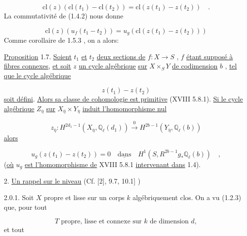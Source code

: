 
\begin{equation}\tag{1.6.8}
\mathrm{cl}(z) (\mathrm{cl}(t_1) - \mathrm{cl}(t_2)) = \mathrm{cl}(z(t_1) - z(t_2)) \quad .
\end{equation}
La commutativité de (1.4.2) nous donne

\begin{equation}\tag{1.6.9}
\mathrm{cl}(z) (u_f(t_1-t_2)) = u_g(\mathrm{cl}(z(t_1) - z(t_2)))
\end{equation}
Comme corollaire de 1.5.3 , on a alors:

\underline{Proposition} 1.7. \underline{Soient} $t_1$ \underline{et} $t_2$ \underline{deux sections de} $f : X \longrightarrow S$ , $f$ \underline{étant supposé à fibres connexes}, \underline{et soit} $z$ \underline{un cycle algébrique} \underline{sur} $X \times_S Y$ \underline{de codimension} $b$ , \underline{tel que le cycle algébrique}

\begin{equation}\tag{1.7.1}
z(t_1) - z(t_2)
\end{equation}
\underline{soit défini}. \underline{Alors sa classe de cohomologie est primitive} (XVIII 5.8.1). \underline{Si le cycle algébrique} $Z_{\overline{\eta}}$ \underline{sur} $X_{\overline{\eta}} \times Y_{\overline{\eta}}$ \underline{induit l'homomorphisme nul}

\begin{equation}\tag{1.7.2}
z_{\overline{\eta}} : H^{2d_1-1} (X_{\overline{\eta}}, \mathbb{Q}_\ell(d_1)) \stackrel{0}{\longrightarrow} H^{2b-1}(Y_{\overline{\eta}}, \mathbb{Q}_\ell(b))
\end{equation}
\underline{alors}

\begin{equation}\tag{1.7.3}
u_g(z(t_1) - z(t_2)) = 0 \quad \underline{\mbox{dans}} \quad H^1(S, R^{2b-1}g_* \mathbb{Q}_\ell(b)) \quad ,
\end{equation}
(\underline{où} $u_g$ \underline{est l'homomorphisme de} XVIII 5.8.1 \underline{intervenant dans} 1.4).




2.  \underline{Un rappel sur le niveau} (Cf. [2], 9.7, 10.1] )

2.0.1. Soit  $X$  propre et lisse sur un corps  $k$  algébriquement clos. On a vu (1.2.3) que, pour tout

\begin{equation}\tag{2.0.2}
T \text{ propre, lisse et connexe sur } k \text{ de dimension } d ,
\end{equation}
et tout

